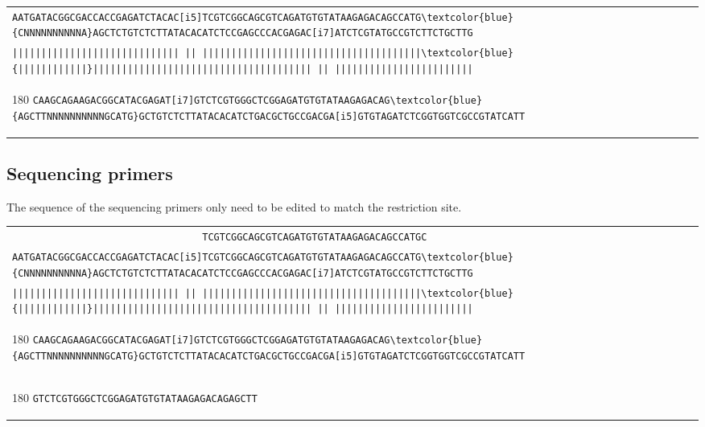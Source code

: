 \documentclass[a4paper,12pt]{article}
\begin{document}
\begin{flushleft}
\begin{tabular}{l}
\Verb+AATGATACGGCGACCACCGAGATCTACAC[i5]TCGTCGGCAGCGTCAGATGTGTATAAGAGACAGCCATG\textcolor{blue}{CNNNNNNNNNNA}AGCTCTGTCTCTTATACACATCTCCGAGCCCACGAGAC[i7]ATCTCGTATGCCGTCTTCTGCTTG+\\[-8pt]
\Verb+||||||||||||||||||||||||||||| || ||||||||||||||||||||||||||||||||||||||\textcolor{blue}{||||||||||||}|||||||||||||||||||||||||||||||||||||| || ||||||||||||||||||||||||+\\[-10pt]
\begin{turn}{180}
\Verb+CAAGCAGAAGACGGCATACGAGAT[i7]GTCTCGTGGGCTCGGAGATGTGTATAAGAGACAG\textcolor{blue}{AGCTTNNNNNNNNNNGCATG}GCTGTCTCTTATACACATCTGACGCTGCCGACGA[i5]GTGTAGATCTCGGTGGTCGCCGTATCATT+
\end{turn}
\\
\end{tabular}

\subsection*{Sequencing primers}
The sequence of the sequencing primers only need to be edited to match the restriction site.

\begin{tabular}{l}
\Verb+                                 TCGTCGGCAGCGTCAGATGTGTATAAGAGACAGCCATGC+\\[-8pt]
\Verb+AATGATACGGCGACCACCGAGATCTACAC[i5]TCGTCGGCAGCGTCAGATGTGTATAAGAGACAGCCATG\textcolor{blue}{CNNNNNNNNNNA}AGCTCTGTCTCTTATACACATCTCCGAGCCCACGAGAC[i7]ATCTCGTATGCCGTCTTCTGCTTG+\\[-8pt]
\Verb+||||||||||||||||||||||||||||| || ||||||||||||||||||||||||||||||||||||||\textcolor{blue}{||||||||||||}|||||||||||||||||||||||||||||||||||||| || ||||||||||||||||||||||||+\\[-10pt]
\begin{turn}{180}
   \Verb+CAAGCAGAAGACGGCATACGAGAT[i7]GTCTCGTGGGCTCGGAGATGTGTATAAGAGACAG\textcolor{blue}{AGCTTNNNNNNNNNNGCATG}GCTGTCTCTTATACACATCTGACGCTGCCGACGA[i5]GTGTAGATCTCGGTGGTCGCCGTATCATT+
\end{turn}
\\[-8pt]
\begin{turn}{180}
   \Verb+GTCTCGTGGGCTCGGAGATGTGTATAAGAGACAGAGCTT                                                                                  +
\end{turn}
\\
\end{tabular}



\end{flushleft}
 

\end{document}
